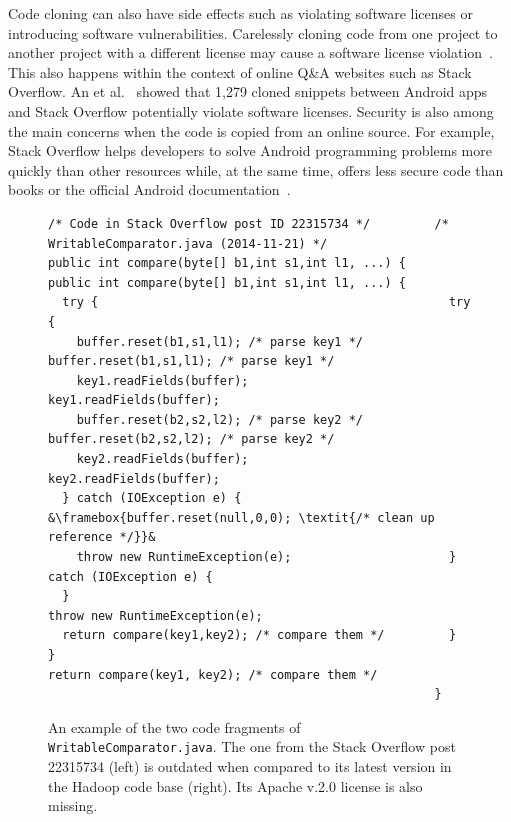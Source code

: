 \documentclass[10pt,journal,compsoc]{IEEEtran}
\begin{document}
Code cloning can also have side effects such as violating software licenses or
introducing software vulnerabilities. Carelessly cloning code from one project
to another project with a different license may cause a software license
violation~\cite{German2009}. This also happens within the context of online Q\&A
websites such as Stack Overflow. An et al.~\cite{An2017} showed that 1,279
cloned snippets between Android apps and Stack Overflow potentially violate
software licenses. Security is also among the main concerns when the code is copied
from an online source. For example, Stack Overflow helps developers to solve
Android programming problems more quickly than other resources while, at the
same time, offers less secure code than books or the official Android
documentation~\cite{Acar2016}.

\begin{figure}
	\begin{lstlisting}[escapechar=&]
/* Code in Stack Overflow post ID 22315734 */         /* WritableComparator.java (2014-11-21) */
public int compare(byte[] b1,int s1,int l1, ...) {    public int compare(byte[] b1,int s1,int l1, ...) {
  try {                                                 try {
    buffer.reset(b1,s1,l1); /* parse key1 */              buffer.reset(b1,s1,l1); /* parse key1 */
    key1.readFields(buffer);                              key1.readFields(buffer);
    buffer.reset(b2,s2,l2); /* parse key2 */              buffer.reset(b2,s2,l2); /* parse key2 */
    key2.readFields(buffer);                              key2.readFields(buffer);
  } catch (IOException e) {                               &\framebox{buffer.reset(null,0,0); \textit{/* clean up reference */}}&
    throw new RuntimeException(e);                      } catch (IOException e) {
  }                                                       throw new RuntimeException(e);
  return compare(key1,key2); /* compare them */         }
}                                                       return compare(key1, key2); /* compare them */
                                                      }
	\end{lstlisting}\vspace{-2ex}
	\caption{An example of the two code fragments of
		{\small\texttt{WritableComparator.java}}. The one from the
		Stack Overflow post 22315734 (left) is outdated when compared to
		its latest version in the \textsf{Hadoop} code base
		(right). Its Apache v.2.0 license is also missing.}
	\label{fig:before-after}
\end{figure}
\end{document}
